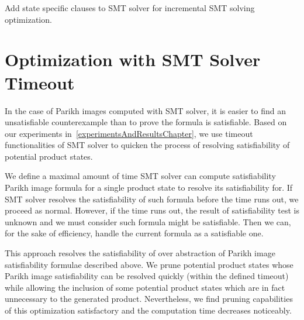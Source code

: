 \begin{algorithm}
\caption{Add state specific clauses to SMT solver for incremental SMT solving optimization.}\label{productConstructionParikhImageAlgorithmAddPersistentClauses}

\DontPrintSemicolon
{}
\end{algorithm}\DecMargin{1em}


\section{Optimization with SMT Solver Timeout}

In the case of Parikh images computed with SMT solver, it is easier to find an unsatisfiable counterexample than to prove the formula is satisfiable. Based on our experiments in~\ref{experimentsAndResultsChapter}, we use timeout functionalities of SMT solver to quicken the process of resolving satisfiability of potential product states.

We define a maximal amount of time SMT solver can compute satisfiability Parikh image formula for a single product state to resolve its satisfiability for. If SMT solver resolves the satisfiability of such formula before the time runs out, we proceed as normal. However, if the time runs out, the result of satisfiability test is unknown and we must consider such formula might be satisfiable. Then we can, for the sake of efficiency, handle the current formula as a satisfiable one.

This approach resolves the satisfiability of over abstraction of Parikh image satisfiability formulae described above. We prune potential product states whose Parikh image satisfiability can be resolved quickly (within the defined timeout) while allowing the inclusion of some potential product states which are in fact unnecessary to the generated product. Nevertheless, we find pruning capabilities of this optimization satisfactory and the computation time decreases noticeably.

